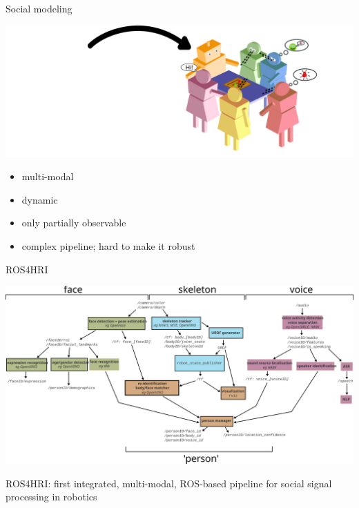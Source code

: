 \documentclass[xcolor=table]{beamer}
\begin{document}


{

\begin{frame}{Social modeling}
    \begin{center}
        \includegraphics[width=0.95\linewidth]{figs/social-interactions/social-complexity}
    \end{center}

     {
        \begin{itemize}
            \item multi-modal
            \item dynamic
            \item only partially observable
            \item complex pipeline; hard to make it robust
        \end{itemize}
    }

\end{frame}
}

{

\begin{frame}{ROS4HRI}
    \begin{center}
        \includegraphics[width=\columnwidth]{architectures/ros4hri-pipeline}
    \end{center}
    ROS4HRI: first integrated, multi-modal, ROS-based pipeline for social signal
    processing in robotics

\end{frame}
}
\end{document}
